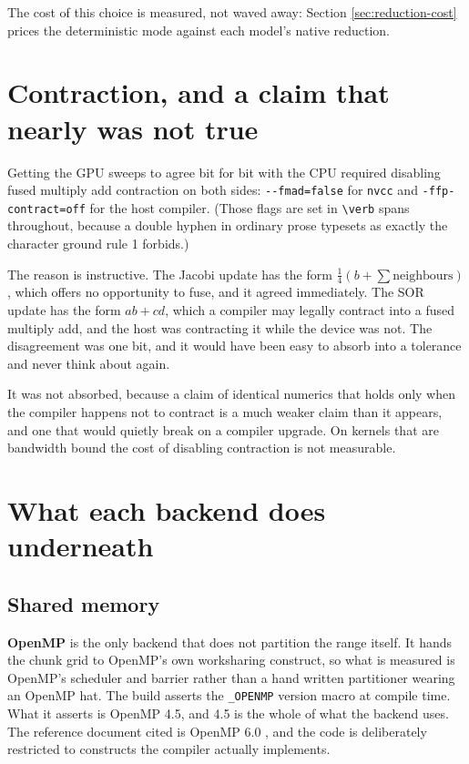 The cost of this choice is measured, not waved away: Section
\ref{sec:reduction-cost} prices the deterministic mode against each model's
native reduction.

\section{Contraction, and a claim that nearly was not true}

Getting the GPU sweeps to agree bit for bit with the CPU required disabling
fused multiply add contraction on both sides: \verb|--fmad=false| for
\texttt{nvcc} and \texttt{-ffp-contract=off} for the host compiler. (Those flags
are set in \verb|\verb| spans throughout, because a double hyphen in ordinary
prose typesets as exactly the character ground rule 1 forbids.)

The reason is instructive. The Jacobi update has the form
$\tfrac{1}{4}(b + \sum \text{neighbours})$, which offers no opportunity to fuse,
and it agreed immediately. The SOR update has the form $ab + cd$, which a
compiler may legally contract into a fused multiply add, and the host was
contracting it while the device was not. The disagreement was one bit, and it
would have been easy to absorb into a tolerance and never think about again.

It was not absorbed, because a claim of identical numerics that holds only when
the compiler happens not to contract is a much weaker claim than it appears, and
one that would quietly break on a compiler upgrade. On kernels that are
bandwidth bound the cost of disabling contraction is not measurable.

\section{What each backend does underneath}

\subsection{Shared memory}

\textbf{OpenMP} is the only backend that does not partition the range itself. It
hands the chunk grid to OpenMP's own worksharing construct, so what is measured
is OpenMP's scheduler and barrier rather than a hand written partitioner wearing
an OpenMP hat. The build asserts the \texttt{\_OPENMP} version macro at compile
time. What it asserts is OpenMP 4.5, and 4.5 is the whole of what the backend
uses. The reference document cited is OpenMP 6.0 \cite{openmp2024}, and the code
is deliberately restricted to constructs the compiler actually implements.

